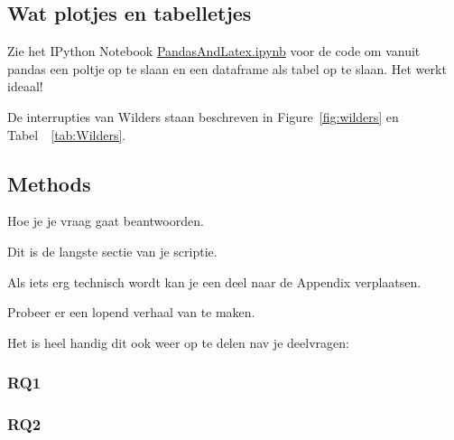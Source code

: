 \subsection{Wat plotjes en tabelletjes}

Zie het IPython Notebook \url{PandasAndLatex.ipynb} voor de code om vanuit pandas een poltje op te slaan en een dataframe als tabel op te slaan. Het werkt ideaal! 

De interrupties van Wilders staan beschreven in Figure~\ref{fig:wilders} en Tabel~~\ref{tab:Wilders}.




\pagebreak



\pagebreak
\subsection{Methods}
Hoe je je vraag gaat beantwoorden.


Dit is de langste sectie van je scriptie. 

Als iets erg technisch wordt kan je een deel naar de Appendix verplaatsen. 

Probeer er een lopend verhaal van te maken.

Het is heel handig dit ook weer op te delen nav je deelvragen:

\subsubsection{RQ1}

\subsubsection{RQ2}
